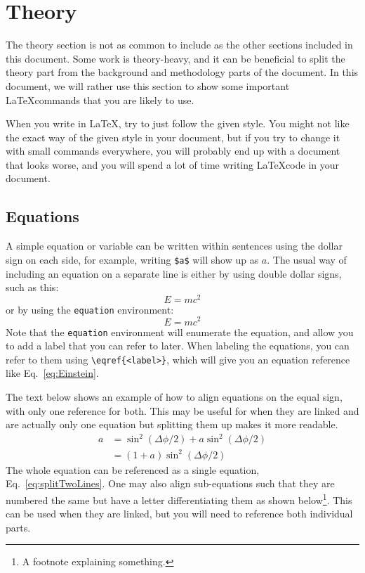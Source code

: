 \chapter{Theory}
\label{chap:Theory}

The theory section is not as common to include as the other sections included in this document. Some work is theory-heavy, and it can be beneficial to split the theory part from the background and methodology parts of the document. In this document, we will rather use this section to show some important \LaTeX commands that you are likely to use.

When you write in \LaTeX, try to just follow the given style. You might not like the exact way of the given style in your document, but if you try to change it with small commands everywhere, you will probably end up with a document that looks worse, and you will spend a lot of time writing \LaTeX code in your document.

\section{Equations}

A simple equation or variable can be written within sentences using the dollar sign on each side, for example, writing \verb=$a$= will show up as $a$. The usual way of including an equation on a separate line is either by using double dollar signs, such as this:
$$E = mc^2$$
or by using the \texttt{equation} environment:
\begin{equation}
    E=mc^2
    \label{eq:Einstein}
\end{equation}
\sloppy Note that the \texttt{equation} environment will enumerate the equation, and allow you to add a label that you can refer to later. When labeling the equations, you can refer to them using \verb=\eqref{<label>}=, which will give you an equation reference like Eq.~\eqref{eq:Einstein}.

The text below shows an example of how to align equations on the equal sign, with only one reference for both. This may be useful for when they are linked and are actually only one equation but splitting them up makes it more readable.
\begin{equation}
\begin{aligned}
        a &= \sin^{2}(\Delta\phi/2) + a \sin^{2}(\Delta\phi/2) \\
         &= (1+a) \sin^{2}(\Delta\phi/2)
\end{aligned}
\label{eq:splitTwoLines}
\end{equation}
The whole equation can be referenced as a single equation, Eq.~\eqref{eq:splitTwoLines}. One may also align sub-equations such that they are numbered the same but have a letter differentiating them as shown below\footnote{A footnote explaining something.}. This can be used when they are linked, but you will need to reference both individual parts.

